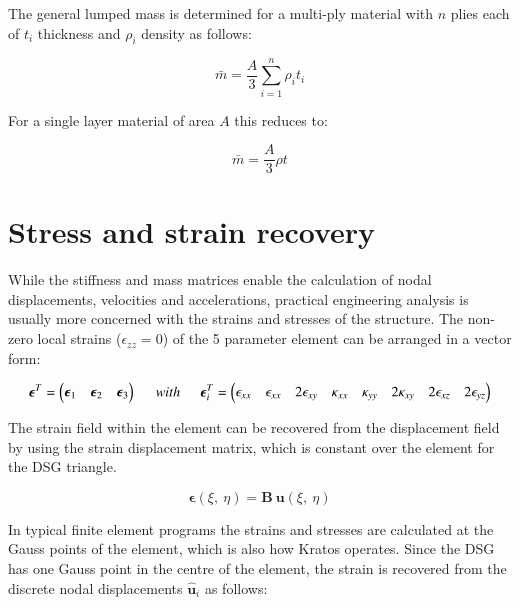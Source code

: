 The general lumped mass is determined for a multi-ply material with $n$ plies each of $t_i$ thickness and $\rho_i$ density as follows:

\begin{equation} 
\bar{m} = \frac{A}{3} \sum_{i=1}^n \rho_i t_i
\label{eqt16}
\end{equation}

For a single layer material of area $A$ this reduces to:

\begin{equation} 
\bar{m} = \frac{A}{3} \rho t
\label{eqt17}
\end{equation}

\section{Stress and strain recovery}

While the stiffness and mass matrices enable the calculation of nodal displacements, velocities and accelerations, practical engineering analysis is usually more concerned with the strains and stresses of the structure. The non-zero local strains ($\epsilon_{zz} = 0$) of the 5 parameter element can be arranged in a vector form:

\begin{equation} 
\boldsymbol{\epsilon}^T = \begin{pmatrix}
\boldsymbol{\epsilon}_1 & \boldsymbol{\epsilon}_2 & \boldsymbol{\epsilon}_3
\end{pmatrix}
\hspace{5mm}
with
\hspace{5mm}
\boldsymbol{\epsilon}^T_i = \begin{pmatrix}
\epsilon_{xx} & \epsilon_{xx} & 2\epsilon_{xy} & \kappa_{xx} & \kappa_{yy} & 2\kappa_{xy} & 2\epsilon_{xz} & 2\epsilon_{yz}
\end{pmatrix}
\label{eqt18}
\end{equation}

The strain field within the element can be recovered from the displacement field by using the strain displacement matrix, which is constant over the element for the DSG triangle.

\begin{equation} 
\boldsymbol{\epsilon}(\xi,\ \eta) = \mathbf{B}\ \mathbf{u}(\xi,\ \eta)
\label{eqt19}
\end{equation}

In typical finite element programs the strains and stresses are calculated at the Gauss points of the element, which is also how Kratos operates. Since the DSG has one Gauss point in the centre of the element, the strain is recovered from the discrete nodal displacements $\hat{\mathbf{u}}_i$ as follows:

